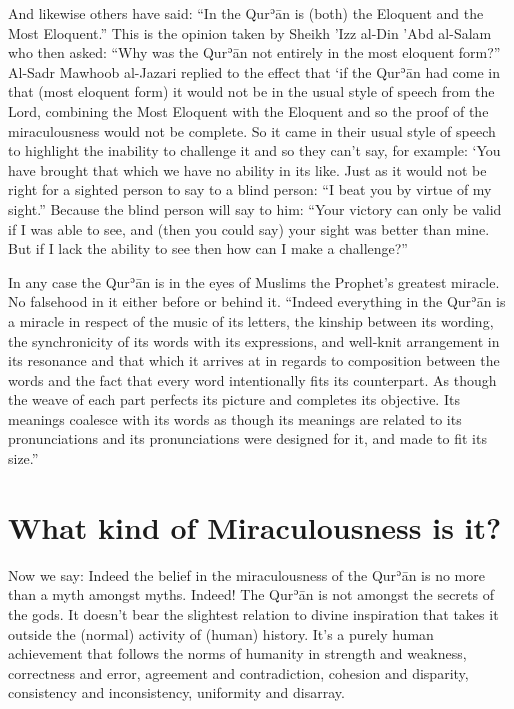\documentclass[12pt]{book}
\def \Quran{Qurʾān} %
\def \Qrn{\Quran}   %
\begin{document}
And likewise others have said: “In the \Qrn{} is (both) the Eloquent and the
Most Eloquent.” This is the opinion taken by Sheikh ’Izz al-Din ’Abd al-Salam
who then asked: “Why was the \Qrn{} not entirely in the most eloquent form?”
Al-Sadr Mawhoob al-Jazari replied to the effect that ‘if the \Qrn{} had come in
that (most eloquent form) it would not be in the usual style of speech from the
Lord, combining the Most Eloquent with the Eloquent and so the proof of the
miraculousness would not be complete. So it came in their usual style of speech
to highlight the inability to challenge it and so they can’t say, for example:
‘You have brought that which we have no ability in its like. Just as it would
not be right for a sighted person to say to a blind person: “I beat you by
virtue of my sight.” Because the blind person will say to him: “Your victory
can only be valid if I was able to see, and (then you could say) your sight was
better than mine. But if I lack the ability to see then how can I make a
challenge?”\footnotemark


In any case the \Qrn{} is in the eyes of Muslims the Prophet’s greatest
miracle. No falsehood in it either before or behind it. “Indeed everything in
the \Qrn{} is a miracle in respect of the music of its letters, the kinship
between its wording, the synchronicity of its words with its expressions,
and well-knit arrangement in its resonance and that which it arrives at in
regards to composition between the words and the fact that every word
intentionally fits its counterpart. As though the weave of each part perfects
its picture and completes its objective. Its meanings coalesce with its
words as though its meanings are related to its pronunciations and its
pronunciations were designed for it, and made to fit its size.”\footnotemark



\section{What kind of Miraculousness is it?}

Now we say: Indeed the belief in the miraculousness of the \Qrn{} is no more
than a myth amongst myths. Indeed! The \Qrn{} is not amongst the secrets of the
gods. It doesn’t bear the slightest relation to divine inspiration that takes
it outside the (normal) activity of (human) history. It’s a purely human
achievement that follows the norms of humanity in strength and weakness,
correctness and error, agreement and contradiction, cohesion and disparity,
consistency and inconsistency, uniformity and disarray.
\end{document}
